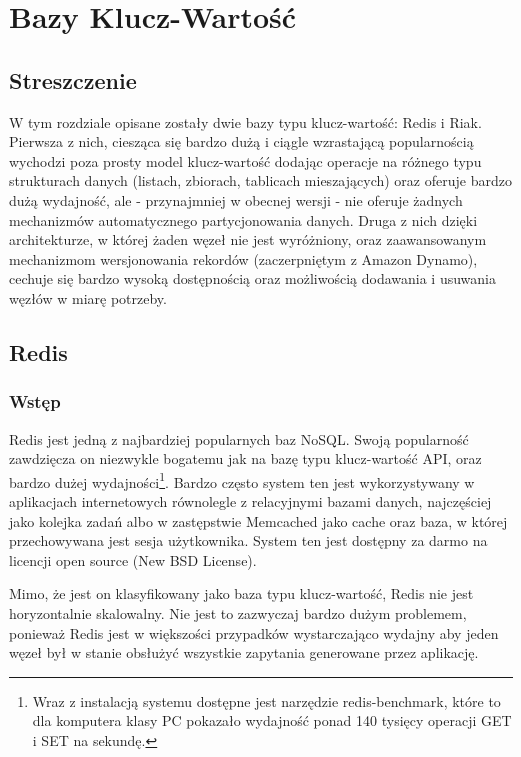 \chapter{Bazy Klucz-Wartość}

\section*{Streszczenie}
W tym rozdziale opisane zostały dwie bazy typu klucz-wartość: Redis i Riak.
Pierwsza z nich, ciesząca się bardzo dużą i ciągle wzrastającą popularnością wychodzi poza prosty model klucz-wartość dodając operacje na różnego typu strukturach danych (listach, zbiorach, tablicach mieszających) oraz oferuje bardzo dużą wydajność, ale - przynajmniej w obecnej wersji - nie oferuje żadnych mechanizmów automatycznego partycjonowania danych.
Druga z nich dzięki architekturze, w której żaden węzeł nie jest wyróżniony, oraz zaawansowanym mechanizmom wersjonowania rekordów (zaczerpniętym z Amazon Dynamo), cechuje się bardzo wysoką dostępnością oraz możliwością dodawania i usuwania węzłów w miarę potrzeby.

\section{Redis}
\label{sec:redis}

\subsection*{Wstęp} 

Redis jest jedną z najbardziej popularnych baz NoSQL.
Swoją popularność zawdzięcza on niezwykle bogatemu jak na bazę typu klucz-wartość API, oraz bardzo dużej wydajności\footnote{Wraz z instalacją systemu dostępne jest narzędzie redis-benchmark, które to dla komputera klasy PC pokazało wydajność ponad 140 tysięcy operacji GET i SET na sekundę.}.
Bardzo często system ten jest wykorzystywany w aplikacjach internetowych równolegle z relacyjnymi bazami danych, najczęściej jako kolejka zadań albo w zastępstwie Memcached jako cache oraz baza, w której przechowywana jest sesja użytkownika.
System ten jest dostępny za darmo na licencji open source (New BSD License).

Mimo, że jest on klasyfikowany jako baza typu klucz-wartość, Redis nie jest horyzontalnie skalowalny.
Nie jest to zazwyczaj bardzo dużym problemem, ponieważ Redis jest w większości przypadków wystarczająco wydajny aby jeden węzeł był w stanie obsłużyć wszystkie zapytania generowane przez aplikację.

